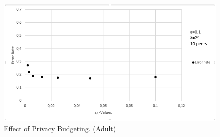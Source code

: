 \begin{figure}[H]
	\centering
	\includegraphics[width=.8\textwidth]{fig/adult/results_privacy_budget}
	\caption{Effect of Privacy Budgeting. (Adult)}
	\label{fig:results_privacy_budget}
\end{figure}




\cleardoublepage